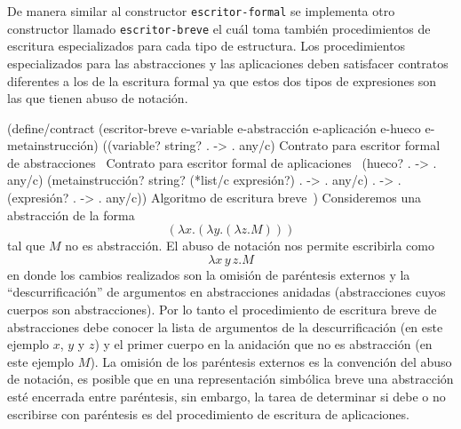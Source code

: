 \documentclass[10pt,oneside,openany,letterpaper]{book}
\begin{document}
De manera similar al constructor {\tt{}\protect{}escritor-formal} se implementa otro constructor llamado {\tt{}\protect{}escritor-breve} el cuál toma también procedimientos de escritura especializados para cada tipo de estructura. Los procedimientos especializados para las abstracciones y las aplicaciones deben satisfacer contratos diferentes a los de la escritura formal ya que estos dos tipos de expresiones son las que tienen abuso de notación.

\nwenddocs{}\plusendmoddef
(define/contract (escritor-breve e-variable e-abstracción e-aplicación
                                 e-hueco e-metainstrucción)
  ((variable? string? . -> . any/c)
   \LA{}Contrato para escritor formal de abstracciones~{\nwtagstyle{}}\RA{}
   \LA{}Contrato para escritor formal de aplicaciones~{\nwtagstyle{}}\RA{}
   (hueco? . -> . any/c)
   (metainstrucción? string? (*list/c expresión?) . -> . any/c)
   . -> . (expresión? . -> . any/c))
  \LA{}Algoritmo de escritura breve~{\nwtagstyle{}}\RA{})
\eatline
{}\nwendcode{}\nwdocspar
Consideremos una abstracción de la forma\[ (λx.(λy.(λz.M))) \]tal que \( M \) no es abstracción. El abuso de notación nos permite escribirla como\[ λx\, y\, z.M \]en donde los cambios realizados son la omisión de paréntesis externos y la ``descurrificación'' de argumentos en abstracciones anidadas (abstracciones cuyos cuerpos son abstracciones). Por lo tanto el procedimiento de escritura breve de abstracciones debe conocer la lista de argumentos de la descurrificación (en este ejemplo \( x \), \( y \) y \( z \)) y el primer cuerpo en la anidación que no es abstracción (en este ejemplo \( M \)). La omisión de los paréntesis externos es la convención del abuso de notación, es posible que en una representación simbólica breve una abstracción esté encerrada entre paréntesis, sin embargo, la tarea de determinar si debe o no escribirse con paréntesis es del procedimiento de escritura de aplicaciones.
\end{document}
